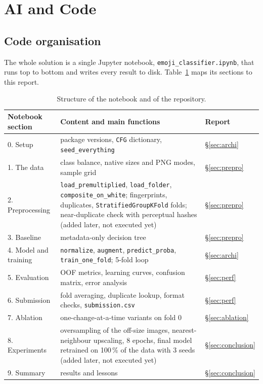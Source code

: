 \documentclass[11pt,a4paper]{article}
\newcommand{\code}[1]{\texttt{\small #1}}
\begin{document}
\section{AI and Code}
\label{sec:code}

\subsection{Code organisation}

The whole solution is a single Jupyter notebook, \code{emoji\_classifier.ipynb}, that runs top to
bottom and writes every result to disk. Table~\ref{tab:code} maps its sections to this report.

\begin{table}[H]
\centering\small
\caption{Structure of the notebook and of the repository.}
\label{tab:code}
\begin{tabularx}{\textwidth}{@{}l X l@{}}
\toprule
\textbf{Notebook section} & \textbf{Content and main functions} & \textbf{Report} \\
\midrule
0. Setup        & package versions, \code{CFG} dictionary, \code{seed\_everything} & \S\ref{sec:archi} \\
1. The data     & class balance, native sizes and PNG modes, sample grid & \S\ref{sec:prepro} \\
2. Preprocessing & \code{load\_premultiplied}, \code{load\_folder}, \code{composite\_on\_white}; fingerprints, duplicates, \code{StratifiedGroupKFold} folds; near-duplicate check with perceptual hashes (added later, not executed yet) & \S\ref{sec:prepro} \\
3. Baseline     & metadata-only decision tree & \S\ref{sec:prepro} \\
4. Model and training & \code{normalize}, \code{augment}, \code{predict\_proba}, \code{train\_one\_fold}; 5-fold loop & \S\ref{sec:archi} \\
5. Evaluation   & OOF metrics, learning curves, confusion matrix, error analysis & \S\ref{sec:perf} \\
6. Submission   & fold averaging, duplicate lookup, format checks, \code{submission.csv} & \S\ref{sec:perf} \\
7. Ablation     & one-change-at-a-time variants on fold 0 & \S\ref{sec:ablation} \\
8. Experiments  & oversampling of the off-size images, nearest-neighbour upscaling, 8 epochs, final model retrained on 100\,\% of the data with 3 seeds (added later, not executed yet) & \S\ref{sec:conclusion} \\[2pt]
9. Summary      & results and lessons & \S\ref{sec:conclusion} \\
\bottomrule
\end{tabularx}
\end{table}
\end{document}
